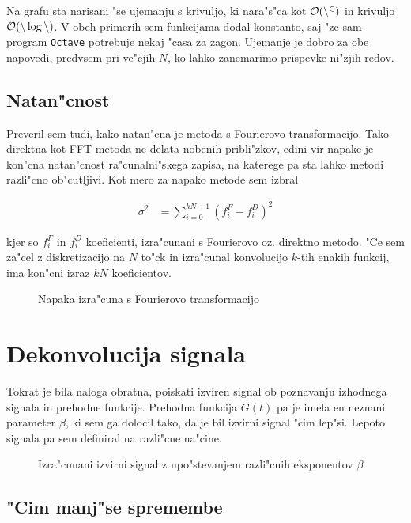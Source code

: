 \documentclass[a4paper,10pt]{article}
\begin{document}
Na grafu sta narisani "se ujemanju s krivuljo, ki nara"s"ca kot $\cal O(n^2)$ in krivuljo $\cal O(n\log n)$. V obeh primerih sem funkcijama dodal konstanto, saj "ze sam program \texttt{Octave} potrebuje nekaj "casa za zagon. Ujemanje je dobro za obe napovedi, predvsem pri ve"cjih $N$, ko lahko zanemarimo prispevke ni"zjih redov. 

\subsection{Natan"cnost}

Preveril sem tudi, kako natan"cna je metoda s Fourierovo transformacijo. Tako direktna kot FFT metoda ne delata nobenih pribli"zkov, edini vir napake je kon"cna natan"cnost ra"cunalni"skega zapisa, na katerege pa sta lahko metodi razli"cno ob"cutljivi. Kot mero za napako metode sem izbral

\begin{align}
 \sigma^2 &= \sum_{i=0}^{kN-1} (f_i^F - f_i^D)^2
\end{align}

kjer so $f_i^F$ in $f_i^D$ koeficienti, izra"cunani s Fourierovo oz. direktno metodo. "Ce sem za"cel z diskretizacijo na $N$ to"ck in izra"cunal konvolucijo $k$-tih enakih funkcij, ima kon"cni izraz $kN$ koeficientov. 


\begin{figure}[h]
 \centering

\caption{Napaka izra"cuna s Fourierovo transformacijo}
\end{figure}

\section{Dekonvolucija signala}

Tokrat je bila naloga obratna, poiskati izviren signal ob poznavanju izhodnega signala in prehodne funkcije. Prehodna funkcija $G(t)$ pa je imela en neznani parameter $\beta$, ki sem ga dolocil tako, da je bil izvirni signal "cim lep"si. Lepoto signala pa sem definiral na razli"cne na"cine. 

\begin{figure}[h]
 
 \caption{Izra"cunani izvirni signal z upo"stevanjem razli"cnih eksponentov $\beta$}
\label{fig:decon-3d}
\end{figure}


\subsection{"Cim manj"se spremembe}
\end{document}
